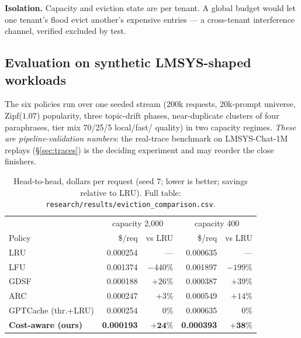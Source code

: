 \textbf{Isolation.} Capacity and eviction state are per tenant. A global
budget would let one tenant's flood evict another's expensive entries
--- a cross-tenant interference channel, verified excluded by test.

\subsection{Evaluation on synthetic LMSYS-shaped workloads}
The six policies run over one seeded stream (200k requests, 20k-prompt
universe, Zipf($1.07$) popularity, three topic-drift phases,
near-duplicate clusters of four paraphrases, tier mix 70/25/5 local/fast/
quality) in two capacity regimes. \emph{These are pipeline-validation
numbers}: the real-trace benchmark on LMSYS-Chat-1M replays
(\S\ref{sec:traces}) is the deciding experiment and may reorder the
close finishers.

\begin{table}[t]
\centering
\caption{Head-to-head, dollars per request (seed 7; lower is better;
savings relative to LRU). Full table:
\texttt{research/results/eviction\_comparison.csv}.}
\label{tab:eviction}
\begin{tabular}{lrrrr}
\toprule
& \multicolumn{2}{c}{capacity 2{,}000} & \multicolumn{2}{c}{capacity 400} \\
Policy & \$/req & vs LRU & \$/req & vs LRU \\
\midrule
LRU                    & 0.000254 & ---      & 0.000635 & ---      \\
LFU                    & 0.001374 & $-440\%$ & 0.001897 & $-199\%$ \\
GDSF                   & 0.000188 & $+26\%$  & 0.000387 & $+39\%$  \\
ARC                    & 0.000247 & $+3\%$   & 0.000549 & $+14\%$  \\
GPTCache (thr.+LRU)    & 0.000254 & $0\%$    & 0.000635 & $0\%$    \\
\textbf{Cost-aware (ours)} & \textbf{0.000193} & $\mathbf{+24\%}$
                       & \textbf{0.000393} & $\mathbf{+38\%}$ \\
\bottomrule
\end{tabular}
\end{table}

